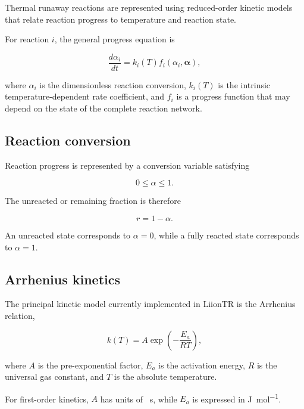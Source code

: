 Thermal runaway reactions are represented using reduced-order kinetic
models that relate reaction progress to temperature and reaction state.

For reaction $i$, the general progress equation is

\begin{equation}
    \frac{d\alpha_i}{dt}
    =
    k_i(T)
    f_i
    \left(
        \alpha_i,
        \mathbf{\alpha}
    \right),
    \label{eq:general_kinetics}
\end{equation}

where $\alpha_i$ is the dimensionless reaction conversion,
$k_i(T)$ is the intrinsic temperature-dependent rate coefficient, and
$f_i$ is a progress function that may depend on the state of the
complete reaction network.


\subsection{Reaction conversion}

Reaction progress is represented by a conversion variable satisfying

\begin{equation}
    0
    \leq
    \alpha
    \leq
    1.
\end{equation}

The unreacted or remaining fraction is therefore

\begin{equation}
    r
    =
    1-\alpha.
\end{equation}

An unreacted state corresponds to $\alpha=0$, while a fully reacted
state corresponds to $\alpha=1$.


\subsection{Arrhenius kinetics}

The principal kinetic model currently implemented in LiionTR is the
Arrhenius relation,

\begin{equation}
    k(T)
    =
    A
    \exp
    \left(
        -\frac{E_a}{RT}
    \right),
    \label{eq:arrhenius}
\end{equation}

where $A$ is the pre-exponential factor, $E_a$ is the activation energy,
$R$ is the universal gas constant, and $T$ is the absolute temperature.

For first-order kinetics, $A$ has units of \si{\per\second}, while
$E_a$ is expressed in \si{\joule\per\mole}.


